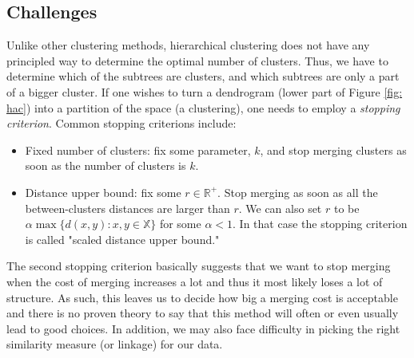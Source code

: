 \subsection{Challenges}

Unlike other clustering methods, hierarchical clustering does not have any principled way to determine the optimal number of clusters. Thus, we have to determine which of the subtrees are clusters, and which subtrees are only a part of a bigger cluster. If one wishes to turn a dendrogram (lower part of Figure \ref{fig: hac}) into a partition of the space (a clustering), one needs to employ a \textit{stopping criterion}. Common stopping criterions include:
\begin{itemize}
	\item Fixed number of clusters: fix some parameter, $k$, and stop merging clusters as soon as the number of clusters is $k$.
	\item Distance upper bound: fix some $r \in \mathbb{R^+}$. Stop merging as soon as all the between-clusters distances are larger than $r$. We can also set $r$ to be $\alpha \max \{d(x,y): x,y \in \mathbb{X} \}$ for some $\alpha <1$. In that case the stopping criterion is called "scaled distance upper bound."
\end{itemize}

The second stopping criterion basically suggests that we want to stop merging when the cost of merging increases a lot and thus it most likely loses a lot of structure. As such, this leaves us to decide how big a merging cost is acceptable and there is no proven theory to say that this method will often or even usually lead to good choices. In addition, we may also face difficulty in picking the right similarity measure (or linkage) for our data.


